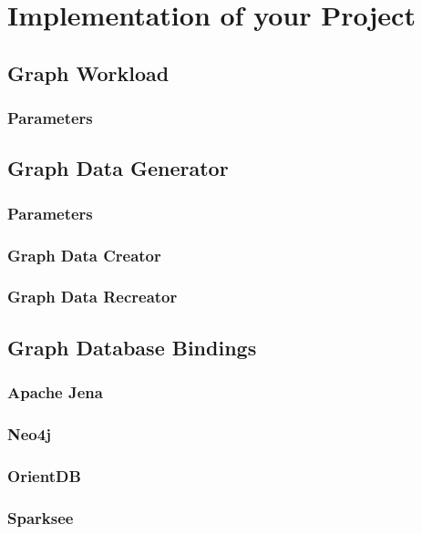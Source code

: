 \chapter{Implementation of your Project}
\label{ch:Implementation}

\section{Graph Workload\label{se:graphWorkload}}

\subsection{Parameters\label{subse:worklaodParameters}}

\section{Graph Data Generator\label{se:graphDataGenerator}}

\subsection{Parameters\label{subse:generatorParameters}}

\subsection{Graph Data Creator\label{subse:graphDataCreator}}

\subsection{Graph Data Recreator\label{subse:graphDataRecreator}}

\section{Graph Database Bindings\label{se:graphDatabaseBindings}}

\subsection{Apache Jena\label{subse:apacheJenaImplementation}}

\subsection{Neo4j\label{subse:neo4jImplementation}}

\subsection{OrientDB\label{subse:orientdbImplementation}}

\subsection{Sparksee\label{subse:sparkseeImplementation}}
